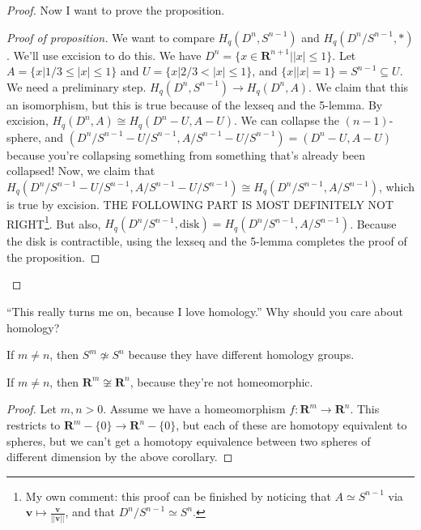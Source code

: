 \begin{proof}
Now I want to prove the proposition. 
\begin{proof}[Proof of proposition]
We want to compare $ H_q(D^n,S^{n-1})$ and $ H_q(D^n/S^{n-1},\ast)$. We'll use excision to do this. We have $D^n=\{ x\in\mathbf{R}^{n+1} | |x|\leq 1 \}$. Let $A=\{ x|1/3\leq |x|\leq 1 \}$ and $U=\{ x|2/3<|x|\leq 1 \}$, and $\{ x||x|=1 \} =S^{n-1}\subseteq U$. We need a preliminary step. $ H_q(D^n,S^{n-1})\to H_q(D^n,A)$. We claim that this an isomorphism, but this is true because of the lexseq and the 5-lemma. By excision, $ H_q(D^n,A)\cong H_q(D^n-U,A-U)$. We can collapse the $(n-1)$-sphere, and $(D^n/S^{n-1}-U/S^{n-1},A/S^{n-1}-U/S^{n-1})=(D^n-U,A-U)$ because you're collapsing something from something that's already been collapsed! Now, we claim that $ H_q(D^n/S^{n-1}-U/S^{n-1},A/S^{n-1}-U/S^{n-1})\cong H_q(D^n/S^{n-1},A/S^{n-1})$, which is true by excision. THE FOLLOWING PART IS MOST DEFINITELY NOT RIGHT\footnote{My own comment: this proof can be finished by noticing that $A\simeq S^{n-1}$ via $\mathbf{v}\mapsto\frac{\mathbf{v}}{||\mathbf{v}||}$, and that $D^n/S^{n-1}\simeq S^n$.}. But also, $ H_q(D^n/S^{n-1},\text{disk})= H_q(D^n/S^{n-1},A/S^{n-1})$. Because the disk is contractible, using the lexseq and the 5-lemma completes the proof of the proposition.
\end{proof}
\end{proof}
``This really turns me on, because I love homology.'' Why should you care about homology?
\begin{corollary}
If $m\neq n$, then $S^m\not\simeq S^n$ because they have different homology groups. 
\end{corollary}
\begin{corollary}
If $m\neq n$, then $\mathbf{R}^m\not\cong \mathbf{R}^n$, because they're not homeomorphic.
\end{corollary}
\begin{proof}
Let $m,n>0$. Assume we have a homeomorphism $f:\mathbf{R}^m\to \mathbf{R}^n$. This restricts to $\mathbf{R}^m-\{0\}\to \mathbf{R}^n-\{0\}$, but each of these are homotopy equivalent to spheres, but we can't get a homotopy equivalence between two spheres of different dimension by the above corollary.
\end{proof}
